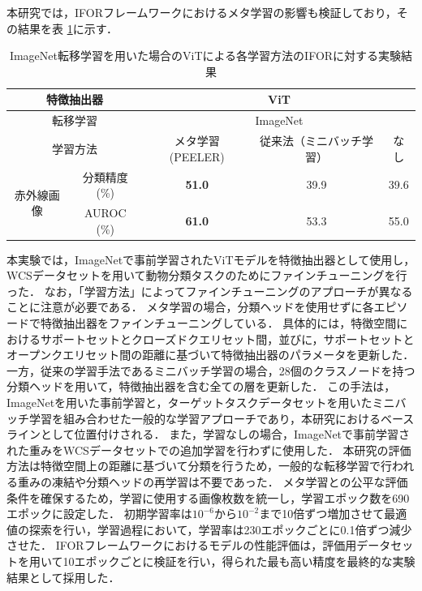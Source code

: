 本研究では，IFORフレームワークにおけるメタ学習の影響も検証しており，その結果を表 \ref{tbl:exp2}に示す．
% 
\begin{table}[tbp]
  \centering
  \caption{ImageNet転移学習を用いた場合のViTによる各学習方法のIFORに対する実験結果}
  \label{tbl:exp2}
  \begin{tabular}{cc||c|c|c}
      \hline
      \multicolumn{2}{c||}{特徴抽出器}          &          \multicolumn{3}{c}{ViT}                \\ \hline
      \multicolumn{2}{c||}{転移学習}            &          \multicolumn{3}{c}{ImageNet}           \\ \hline
      \multicolumn{2}{c||}{学習方法}            & メタ学習 (PEELER)  & 従来法（ミニバッチ学習） & なし  \\ \hline\hline
      \multirow{2}{*}{赤外線画像} & 分類精度 (\%) &  \textbf{51.0}   &        39.9          & 39.6  \\
                                & AUROC (\%)   &  \textbf{61.0}   &        53.3          & 55.0  \\ \hline
  \end{tabular}
\end{table}
% 
本実験では，ImageNetで事前学習されたViTモデルを特徴抽出器として使用し，WCSデータセットを用いて動物分類タスクのためにファインチューニングを行った．
なお，「学習方法」によってファインチューニングのアプローチが異なることに注意が必要である．
メタ学習の場合，分類ヘッドを使用せずに各エピソードで特徴抽出器をファインチューニングしている．
具体的には，特徴空間におけるサポートセットとクローズドクエリセット間，並びに，サポートセットとオープンクエリセット間の距離に基づいて特徴抽出器のパラメータを更新した．
一方，従来の学習手法であるミニバッチ学習の場合，28個のクラスノードを持つ分類ヘッドを用いて，特徴抽出器を含む全ての層を更新した．
この手法は，ImageNetを用いた事前学習と，ターゲットタスクデータセットを用いたミニバッチ学習を組み合わせた一般的な学習アプローチであり，本研究におけるベースラインとして位置付けされる．
また，学習なしの場合，ImageNetで事前学習された重みをWCSデータセットでの追加学習を行わずに使用した．
本研究の評価方法は特徴空間上の距離に基づいて分類を行うため，一般的な転移学習で行われる重みの凍結や分類ヘッドの再学習は不要であった．
メタ学習との公平な評価条件を確保するため，学習に使用する画像枚数を統一し，学習エポック数を690エポックに設定した．
初期学習率は$10^{-6}$から$10^{-2}$まで10倍ずつ増加させて最適値の探索を行い，学習過程において，学習率は230エポックごとに0.1倍ずつ減少させた．
IFORフレームワークにおけるモデルの性能評価は，評価用データセットを用いて10エポックごとに検証を行い，得られた最も高い精度を最終的な実験結果として採用した．


